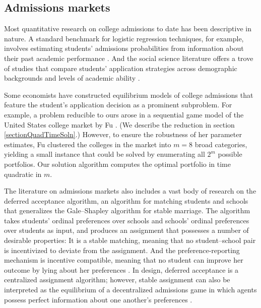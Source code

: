\subsection{Admissions markets}

Most quantitative research on college admissions to date has been descriptive in nature. A standard benchmark for logistic regression techniques, for example, involves estimating students' admissions probabilities from information about their past academic performance \cite{acharyaetal2019,lim2013}. And the social science literature offers a trove of studies that compare students' application strategies across demographic backgrounds and levels of academic ability \cite{gurantzetal2021,hartlaubandschneider2012,hoxbyandturner2013,hoxbyandavery2012}.


Some economists have constructed equilibrium models of college admissions that feature the student's application decision as a prominent subproblem. For example, a problem reducible to ours arose in a sequential game model of the United States college market by Fu \cite{fu2014}. (We describe the reduction in section \ref{sectionQuadTimeSoln}.) However, to ensure the robustness of her parameter estimates, Fu clustered the colleges in the market into $m=8$ broad categories, yielding a small instance that could be solved by enumerating all $2^m$ possible portfolios. Our solution algorithm computes the optimal portfolio in time quadratic in $m$. 

The literature on admissions markets also includes a vast body of research on the deferred acceptance algorithm, an algorithm for matching students and schools that generalizes the Gale--Shapley algorithm for stable marriage. The algorithm takes students' ordinal preferences over schools and schools' ordinal preferences over students as input, and produces an assignment that possesses a number of desirable properties: It is a stable matching, meaning that no student--school pair is incentivized to deviate from the assignment. And the preference-reporting mechanism is incentive compatible, meaning that no student can improve her outcome by lying about her preferences \cite{galeandshapley1962,roth1982}. In design, deferred acceptance is a centralized assignment algorithm; however, stable assignment can also be interpreted as the equilibrium of a decentralized admissions game in which agents possess perfect information about one another's preferences \cite{azevedoandleshno2016}.

